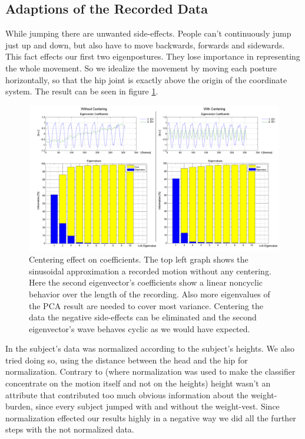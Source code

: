 \documentclass[a4paper]{article}
\begin{document}
\subsection{Adaptions of the Recorded Data}
While jumping there are unwanted side-effects. People can't continuously jump just up and down, but also have to move backwards, forwards and sidewards. This fact effects our first two eigenpostures. They lose importance in representing the whole movement. So we idealize the movement by moving each posture horizontally, so that the hip joint is exactly above the origin of the coordinate system.
The result can be seen in figure \ref{fig:sammel}.


\begin{figure}
	\centering
	\includegraphics[width=15cm]{sammel.png}
	\caption{Centering effect on coefficients. The top left graph shows the sinusoidal approximation a recorded motion without any centering. Here the second eigenvector's coefficients show a linear noncyclic behavior over the length of the recording.
	Also more eigenvalues of the PCA result are needed to cover most variance.
	Centering the data the negative side-effects can be eliminated and the second eigenvector's wave behaves cyclic as we would have expected.}
	\label{fig:sammel}
\end{figure}

In \cite{origin} the subject's data was normalized according to the subject's heights. We also tried doing so, using the distance between the head and the hip for normalization. Contrary to \cite{origin} (where normalization was used to make the classifier concentrate on the motion itself and not on the heights) height wasn't an attribute that contributed too much obvious information about the weight-burden, since every subject jumped with and without the weight-vest. Since normalization effected our results highly in a negative way we did all the further steps with the not normalized data.
\end{document}
